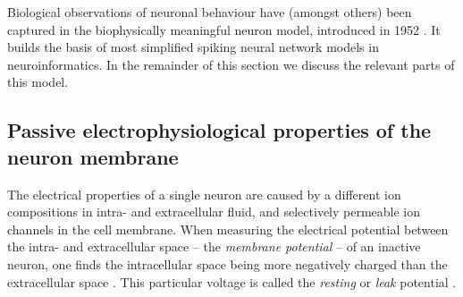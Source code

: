 Biological observations of neuronal behaviour have (amongst others) been captured in the biophysically meaningful \HH neuron model, introduced in 1952  \cite{hodgkin1952quantitative}. It builds the basis of most simplified spiking neural network models in neuroinformatics. In the remainder of this section we discuss the relevant parts of this model.

\subsection{Passive electrophysiological properties of the neuron membrane}
\label{sec:electrophysiological_properties}

The electrical properties of a single neuron are caused by a different ion compositions in intra- and extracellular fluid, and selectively permeable ion channels in the cell membrane. When measuring the electrical potential between the intra- and extracellular space -- the \emph{membrane potential} {\um} -- of an inactive neuron, one finds the intracellular space being more negatively charged than the extracellular space \cite{kandel2012principles}. This particular voltage is called the \emph{resting} or \emph{leak} potential \El.


